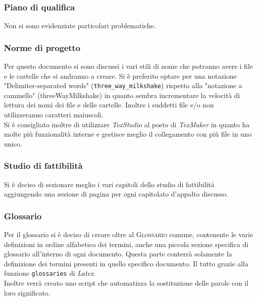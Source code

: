 \subsubsection{Piano di qualifica}
Non si sono evidenziate particolari problematiche.


\subsubsection{Norme di progetto}
Per questo documento si sono discussi i vari stili di nome che potranno avere i file e le cartelle che si andranno a creare. Si è preferito optare per una notazione "Delimiter-separated words" (\texttt{three\_way\_milkshake}) rispetto alla "notazione a cammello" (threeWayMilkshake) in quanto sembra incrementare la velocità di lettura dei nomi dei file e delle cartelle. Inoltre i suddetti file e/o non utilizzeranno caratteri maiuscoli.\\
Si è consigliato inoltre di utilizzare \textit{TexStudio} al posto di \textit{TexMaker} in quanto ha molte più funzionalità interne e gestisce meglio il collegamento con più file in uno unico.

\subsubsection{Studio di fattibilità}
Si è deciso di sezionare meglio i vari capitoli dello studio di fattibilità aggiungendo una sezione di pagina per ogni capitolato d'appalto discusso.

\subsubsection{Glossario}
Per il glossario si è deciso di creare oltre al \textsc{Glossario} comune, contenente le varie definizioni in ordine alfabetico dei termini, anche una piccola sezione specifica di glossario all'interno di ogni documento. Questa parte conterrà solamente la definizione dei termini presenti in quello specifico documento. Il tutto grazie alla funzione \texttt{glossaries} di \textit{Latex}.\\
Inoltre verrà creato uno script che automatizza la sostituzione delle parole con il loro significato.
 